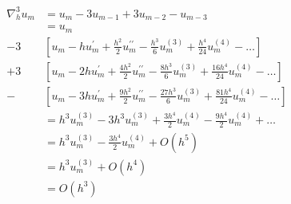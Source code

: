 \begin{align*}
    \nabla_h^3 u_m & = u_m - 3u_{m-1} + 3u_{m-2} - u_{m-3}                                                                                                    \\
                   & = u_m                                                                                                                                    \\
    - 3            & \left[u_m - h u_m^{\prime} + \frac{h^2}{2} u_m^{\prime\prime} - \frac{h^3}{6} u_m^{(3)} + \frac{h^4}{24} u_m^{(4)} - \hdots\right]       \\
    + 3            & \left[u_m - 2h u_m^{\prime} + \frac{4h^2}{2} u_m^{\prime\prime} - \frac{8h^3}{6} u_m^{(3)} + \frac{16h^4}{24} u_m^{(4)} - \hdots\right]  \\
    -              & \left[u_m - 3h u_m^{\prime} + \frac{9h^2}{2} u_m^{\prime\prime} - \frac{27h^3}{6} u_m^{(3)} + \frac{81h^4}{24} u_m^{(4)} - \hdots\right] \\
                   & = h^3 u_m^{(3)} - 3h^3 u_m^{(3)} + \frac{3h^4}{2} u_m^{(4)} - \frac{9h^4}{2} u_m^{(4)} + \hdots                                          \\
                   & = h^3 u_m^{(3)} - \frac{3h^4}{2} u_m^{(4)} + O(h^5)                                                                                      \\
                   & = h^3 u_m^{(3)} + O(h^4)                                                                                                                 \\
                   & = O(h^3)
\end{align*}

